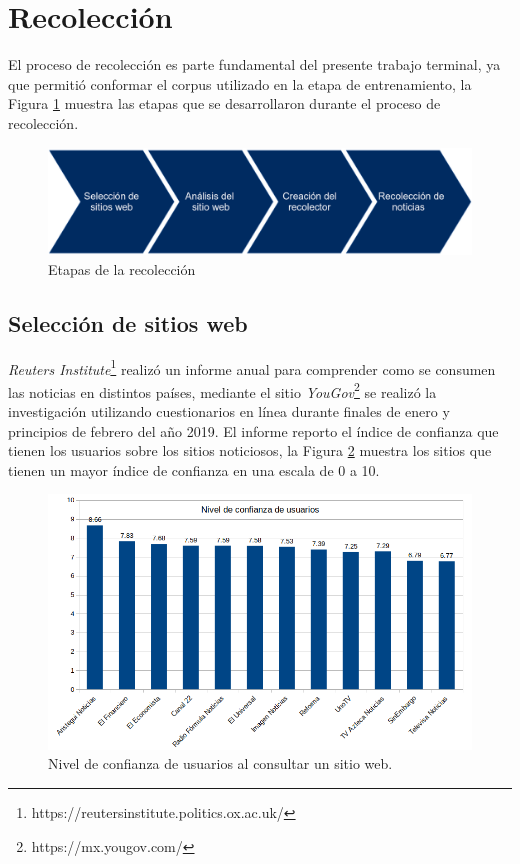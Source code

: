\section{Recolección}


El proceso de recolección es parte fundamental del presente trabajo terminal, ya que permitió conformar el corpus utilizado en la etapa de entrenamiento, la Figura \ref{fig:etapRecoleccion} muestra las etapas que se desarrollaron durante el proceso de recolección.\\

\begin{figure}[H]
	\centering
	\includegraphics[scale=.28]{imagenes/Capitulo5/etapasRecoleccion.png}
	\caption{Etapas de la recolección}
	\label{fig:etapRecoleccion}
\end{figure}

\subsection{Selección de sitios web}
\textit{Reuters Institute}\footnote{https://reutersinstitute.politics.ox.ac.uk/} realizó un informe anual para comprender como se consumen las noticias en distintos países, mediante el sitio \textit{YouGov}\footnote{https://mx.yougov.com/} se realizó la investigación utilizando cuestionarios en línea durante finales de enero y principios de febrero del año 2019. El informe reporto el índice de confianza que tienen los usuarios sobre los sitios noticiosos, la Figura \ref{fig:nivConfianza} muestra los sitios que tienen un mayor índice de confianza en una escala de 0 a 10.  

\begin{figure}[H]
  \centering
  \includegraphics[scale=.4]{imagenes/Capitulo5/nivelConfianza.png}
  \caption{Nivel de confianza de usuarios al consultar un sitio web.}
  \label{fig:nivConfianza}
\end{figure}

